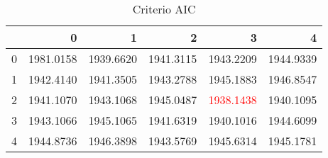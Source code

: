 \begin{table}[H]
\label{tab:autoarima_aic}
\centering
\begin{tabular}{lrrrrr}
\toprule
 & 0 & 1 & 2 & 3 & 4 \\
\midrule
0 & 1981.0158 & 1939.6620 & 1941.3115 & 1943.2209 & 1944.9339 \\
1 & 1942.4140 & 1941.3505 & 1943.2788 & 1945.1883 & 1946.8547 \\
2 & 1941.1070 & 1943.1068 & 1945.0487 & \textcolor{red}{1938.1438} & 1940.1095 \\
3 & 1943.1066 & 1945.1065 & 1941.6319 & 1940.1016 & 1944.6099 \\
4 & 1944.8736 & 1946.3898 & 1943.5769 & 1945.6314 & 1945.1781 \\
\bottomrule
\end{tabular}
\caption{Criterio AIC}
\end{table}
